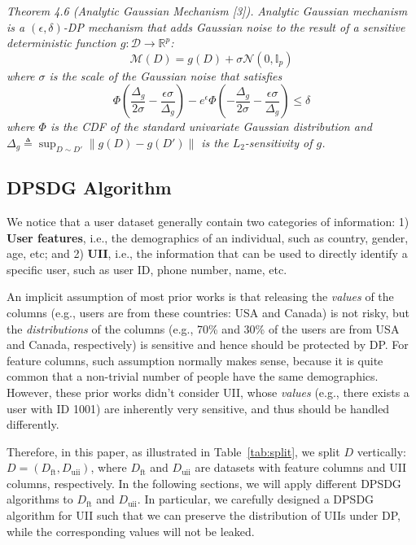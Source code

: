 \documentclass[11pt]{article}
\begin{document}
\textit{Theorem 4.6 (Analytic Gaussian Mechanism [3]).}
\textit{Analytic Gaussian mechanism is a $(\epsilon,\delta)$-DP mechanism
that adds Gaussian noise to the result of a sensitive deterministic
function $g : \mathcal{D} \to \mathbb{R}^p$:}
\begin{equation}
\mathcal{M}(D) = g(D) + \sigma\mathcal{N}(0, \mathbb{I}_p)
\end{equation}
\textit{where $\sigma$ is the scale of the Gaussian noise that satisfies}
\begin{equation}
\Phi\!\left(\frac{\Delta_g}{2\sigma} - \frac{\epsilon\sigma}{\Delta_g}\right)
- e^{\epsilon}\Phi\!\left(-\frac{\Delta_g}{2\sigma} - \frac{\epsilon\sigma}{\Delta_g}\right) \leq \delta
\end{equation}
\textit{where $\Phi$ is the CDF of the standard univariate Gaussian distribution
and $\Delta_g \triangleq \sup_{D \sim D'} \|g(D) - g(D')\|$ is the $L_2$-sensitivity of $g$.}

\subsection{DPSDG Algorithm}
We notice that a user dataset generally contain two categories of information:
1) \textbf{User features}, i.e., the demographics of an individual,
such as country, gender, age, etc; and 2) \textbf{UII}, i.e., the information
that can be used to directly identify a specific user, such as user ID,
phone number, name, etc.

An implicit assumption of most prior works is that releasing the
\textit{values} of the columns (e.g., users are from these countries: USA and
Canada) is not risky, but the \textit{distributions} of the columns (e.g., 70\%
and 30\% of the users are from USA and Canada, respectively) is
sensitive and hence should be protected by DP. For feature columns,
such assumption normally makes sense, because it is quite common
that a non-trivial number of people have the same demographics.
However, these prior works didn't consider UII, whose \textit{values} (e.g.,
there exists a user with ID 1001) are inherently very sensitive, and
thus should be handled differently.

Therefore, in this paper, as illustrated in Table~\ref{tab:split}, we split $D$
vertically: $D = (D_{\text{ft}}, D_{\text{uii}})$, where $D_{\text{ft}}$ and $D_{\text{uii}}$
are datasets with feature columns and UII columns, respectively. In the following
sections, we will apply different DPSDG algorithms to $D_{\text{ft}}$ and $D_{\text{uii}}$.
In particular, we carefully designed a DPSDG algorithm for UII such
that we can preserve the distribution of UIIs under DP, while the
corresponding values will not be leaked.
\end{document}
